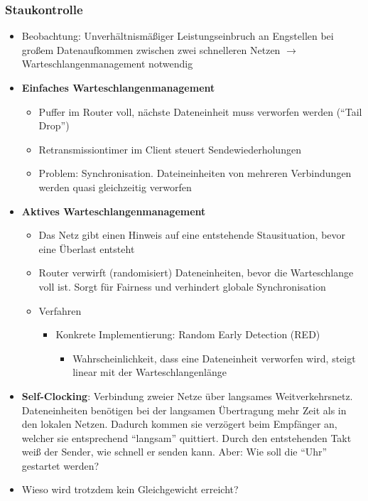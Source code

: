 \subsubsection{Staukontrolle}
\begin{itemize}
	\item Beobachtung: Unverhältnismäßiger Leistungseinbruch an Engstellen bei großem Datenaufkommen zwischen zwei schnelleren Netzen \(\rightarrow\) Warteschlangenmanagement notwendig
	\item \textbf{Einfaches Warteschlangenmanagement}
	\begin{itemize}
		\item Puffer im Router voll, nächste Dateneinheit muss verworfen werden ("`Tail Drop"')
		\item Retransmissiontimer im Client steuert Sendewiederholungen
		\item Problem: Synchronisation. Dateineinheiten von mehreren Verbindungen werden quasi gleichzeitig verworfen
	\end{itemize}
	\item \textbf{Aktives Warteschlangenmanagement}
	\begin{itemize}
		\item Das Netz gibt einen Hinweis auf eine entstehende Stausituation, bevor eine Überlast entsteht
		\item Router verwirft (randomisiert) Dateneinheiten, bevor die Warteschlange voll ist. Sorgt für Fairness und verhindert globale Synchronisation
		\item Verfahren
		\begin{itemize}
			\item Konkrete Implementierung: Random Early Detection (RED)
			\begin{itemize}
				\item Wahrscheinlichkeit, dass eine Dateneinheit verworfen wird, steigt linear mit der Warteschlangenlänge
			\end{itemize}
		\end{itemize}
	\end{itemize}
	\item \textbf{Self-Clocking}: Verbindung zweier Netze über langsames Weitverkehrsnetz. Dateneinheiten benötigen bei der langsamen Übertragung mehr Zeit als in den lokalen Netzen. Dadurch kommen sie verzögert beim Empfänger an, welcher sie entsprechend "`langsam"' quittiert. Durch den entstehenden Takt weiß der Sender, wie schnell er senden kann. Aber: Wie soll die "`Uhr"' gestartet werden?
	\item Wieso wird trotzdem kein Gleichgewicht erreicht?

\end{itemize}
